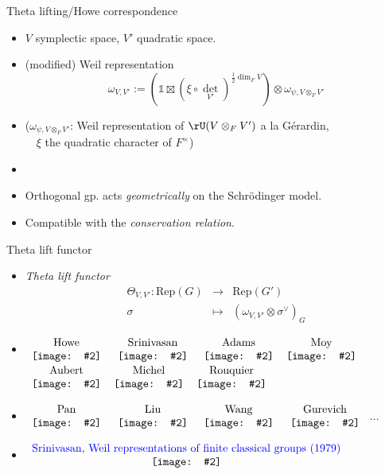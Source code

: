 \documentclass[t,mathserif,11pt,usenames,dvipsnames]{beamer}
\theoremstyle{plain}
\theoremstyle{definition}
\newcommand{\bbone}{\mathbb{1}}
\def\Rep{{\mathrm{Rep}}}
\def\half{{\frac{1}{2}}}
\def\blue{\color{blue}}
\let\oldemph\emph
\def\emph#1{\oldemph{\blue #1}}
\def\hhgraph#1#2#3{\ensuremath{\begin{array}{c}\text{#3}\\
        \hbox{\texttt{[image: \#2]}}
        \end{array}}}
\begin{document}
\begin{frame}{Theta lifting/Howe correspondence}
  \begin{itemize}
    \item $V$ symplectic space, $V'$ quadratic space.
    \item (modified) Weil representation
          \[
          \omega_{V,V'}:=
            \left(\bbone \boxtimes (\xi\circ {\det}_{V'})^{\half\dim_F V} \right)\otimes
            \omega_{\psi, V\otimes_F V'}
          \]
    \item[] ($\omega_{\psi, V\otimes_{F} V'}$: Weil representation of
          $\rU(V\otimes_F V')$ a la  G\'erardin,\\
          \ \ $\xi$ the quadratic character of $ F^\times$)
    \item[]
    \item Orthogonal gp. acts \emph{geometrically} on the Schr\"odinger model.
    \item Compatible with the \emph{conservation relation}.
  \end{itemize}
\end{frame}

\begin{frame}{Theta lift functor}
  \begin{itemize}
    \item[] \emph{Theta lift functor} %
          \[
          \begin{array}{rcl}
            \Theta_{V,V'} \colon \Rep(G)  & \longrightarrow & \Rep(G')  \\
            \sigma & \mapsto & \left(\omega_{V,V'}\otimes\sigma^{\vee} \right)_{G}
          \end{array}
          \] \pause
    \item[] 
    \hspace{-3em} 
 $\hhgraph{0.11\textwidth}{Howe}{Howe}$
    $\hhgraph{0.12\textwidth}{Srini2}{Srinivasan}$\hspace{-.5em}
$\hhgraph{0.09\textwidth}{Adams}{Adams}$\hspace{-.5em}$\hhgraph{0.1\textwidth}{Moy}{Moy}$
$\hhgraph{0.09\textwidth}{Aubert}{Aubert}$\hspace{-.5em}$\hhgraph{0.09\textwidth}{Michel}{Michel}$\hspace{-.5em}$\hhgraph{0.09\textwidth}{Rouquier}{Rouquier}$
\item[] \hspace{-2em}
$\hhgraph{0.09\textwidth}{Pan}{Pan}$
$\hhgraph{0.09\textwidth}{Liu}{Liu}$\hspace{-.5em}
$\hhgraph{0.09\textwidth}{Wang}{Wang}$
$\hhgraph{0.09\textwidth}{Gurevich}{Gurevich}$
          ...\pause
    \item[]\hspace{-2em}
          $\hhgraph{0.2\textwidth}{Srini-paper}{{\color{blue}Srinivasan, Weil representations of finite classical groups (1979)}}$
  \end{itemize}
\end{frame}
\end{document}
